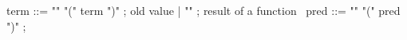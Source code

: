 \begin{syntax}
  term ::= "\old" "(" term ")" ; old value
       | "\result" ; result of a function
       \
  pred ::= "\old" "(" pred ")" ;
\end{syntax}

